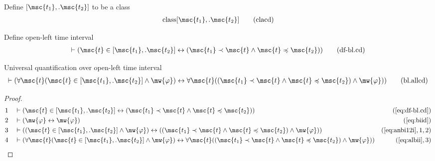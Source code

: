\begin{metadefinition} Define $[ \msc{t_1}  ,.  \msc{t_2} ]$ to
be a class
\begin{align}
{\rm class} [ \msc{t_1} ,. \msc{t_2} ]\label{eq:clacd}\tag{clacd}
\end{align}
\end{metadefinition}

\begin{metadefinition} Define open-left time interval
\begin{align}
\vdash ( \msc{t} \in [ \msc{t_1} ,. \msc{t_2} ] \leftrightarrow ( \msc{t_1}
    \prec \msc{t} \wedge \msc{t} \preccurlyeq \msc{t_2} )
    )\label{eq:df-bl.cd}\tag{df-bl.cd}
\end{align}
\end{metadefinition}

\begin{lemma} Universal quantification over open-left
time interval
\begin{align}
\vdash ( \forall \msc{t} ( \msc{t} \in [ \msc{t_1} ,. \msc{t_2} ] \wedge
    \mw{\varphi} ) \leftrightarrow \forall \msc{t} ( ( \msc{t_1} \prec \msc{t}
    \wedge \msc{t} \preccurlyeq \msc{t_2} ) \wedge \mw{\varphi} )
    )\label{eq:bl.allcd}\tag{bl.allcd}
\end{align}
\end{lemma}

\begin{proof}
\begin{align}
  1 &&  & \vdash ( \msc{t} \in [ \msc{t_1} ,. \msc{t_2} ] \leftrightarrow ( \msc{t_1} \prec \msc{t} \wedge \msc{t} \preccurlyeq \msc{t_2} ) )&(\mbox{\ref{eq:df-bl.cd}})\notag
  \\ 2 &&  & \vdash ( \mw{\varphi} \leftrightarrow \mw{\varphi} )&(\mbox{\ref{eq:biid}})\notag
  \\ 3 &&  & \vdash ( ( \msc{t} \in [ \msc{t_1} ,. \msc{t_2} ] \wedge \mw{\varphi} ) \leftrightarrow ( ( \msc{t_1} \prec \msc{t} \wedge \msc{t} \preccurlyeq \msc{t_2} ) \wedge \mw{\varphi} ) )&(\mbox{\ref{eq:anbi12i}},1,2)\notag
  \\ 4 &&  & \vdash ( \forall \msc{t} ( \msc{t} \in [ \msc{t_1} ,. \msc{t_2} ] \wedge \mw{\varphi} ) \leftrightarrow \forall \msc{t} ( ( \msc{t_1} \prec \msc{t} \wedge \msc{t} \preccurlyeq \msc{t_2} ) \wedge \mw{\varphi} ) )&(\mbox{\ref{eq:albii}},3)\notag
\end{align}
\end{proof}

